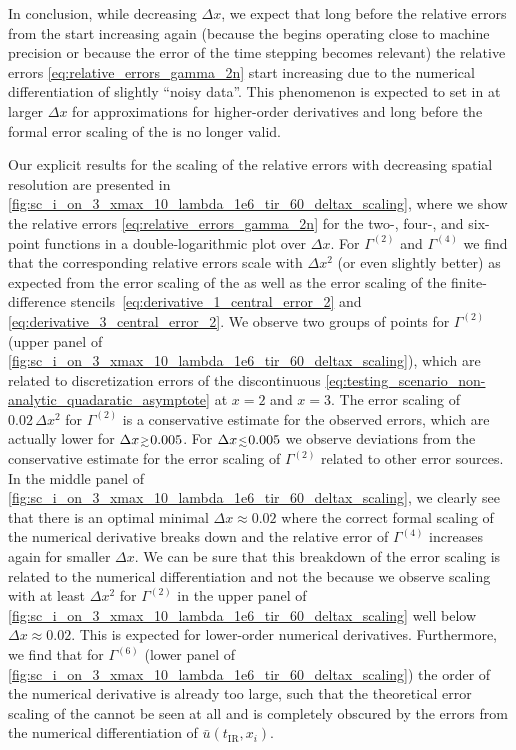 In conclusion, while decreasing $\Delta x$, we expect that long before the relative errors from the \ktScheme{} start increasing again (because the \ktScheme{} begins operating close to machine precision or because the error of the time stepping becomes relevant) the relative errors \eqref{eq:relative_errors_gamma_2n} start increasing due to the numerical differentiation of slightly ``noisy data''. 
This phenomenon is expected to set in at larger $\Delta x$ for approximations for higher-order derivatives and long before the formal error scaling of the \ktScheme{} is no longer valid.

Our explicit results for the scaling of the relative errors with decreasing spatial resolution are presented in \cref{fig:sc_i_on_3_xmax_10_lambda_1e6_tir_60_deltax_scaling}, where we show the relative errors \eqref{eq:relative_errors_gamma_2n} for the \hbox{two-}, \hbox{four-}, and six-point functions in a double-logarithmic plot over $\Delta x$.
For $\Gamma^{(2)}$ and $\Gamma^{(4)}$ we find that the corresponding relative errors scale with $\Delta x^2$ (or even slightly better) as expected from the error scaling of the \ktScheme{} as well as the error scaling of the finite-difference stencils~\eqref{eq:derivative_1_central_error_2} and \eqref{eq:derivative_3_central_error_2}.
We observe two groups of points for $\Gamma^{(2)}$ (upper panel of \cref{fig:sc_i_on_3_xmax_10_lambda_1e6_tir_60_deltax_scaling}), which are related to discretization errors of the discontinuous \ic{} \eqref{eq:testing_scenario_non-analytic_quadaratic_asymptote} at $x=2$ and $x=3$. 
The error scaling of $0.02\, \Delta x^2$ for $\Gamma^{(2)}$ is a conservative estimate for the observed errors, which are actually lower for $\Delta x \smallergtrsim 0.005$. 
For $\Delta x \smallerlesssim 0.005$ we observe deviations from the conservative estimate for the error scaling of $\Gamma^{(2)}$ related to other error sources.
In the middle panel of \cref{fig:sc_i_on_3_xmax_10_lambda_1e6_tir_60_deltax_scaling}, we clearly see that there is an optimal minimal $\Delta x \approx 0.02$ where the correct formal scaling of the numerical derivative breaks down and the relative error of $\Gamma^{(4)}$ increases again for smaller $\Delta x$.
We can be sure that this breakdown of the error scaling is related to the numerical differentiation and not the \ktScheme{} because we observe scaling with at least $\Delta x^2$ for $\Gamma^{(2)}$ in the upper panel of \cref{fig:sc_i_on_3_xmax_10_lambda_1e6_tir_60_deltax_scaling} well below $\Delta x \approx 0.02$.
This is expected for lower-order numerical derivatives.
Furthermore, we find that for $\Gamma^{(6)}$ (lower panel of \cref{fig:sc_i_on_3_xmax_10_lambda_1e6_tir_60_deltax_scaling}) the order of the numerical derivative is already too large, such that the theoretical error scaling of the \ktScheme{} cannot be seen at all and is completely obscured by the errors from the numerical differentiation of $\bar{u} ( t_\mathrm{IR}, x_i )$.

